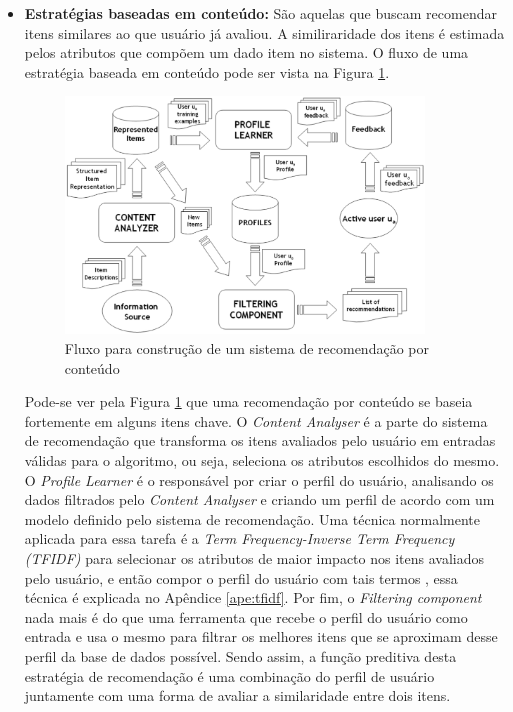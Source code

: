 \begin{itemize}
    \item \textbf{Estratégias baseadas em conteúdo: } São aquelas que buscam
        recomendar itens similares ao que usuário já avaliou. A similiraridade
        dos itens é estimada pelos atributos que compõem um dado item no
        sistema. O fluxo de uma estratégia baseada em conteúdo pode ser vista na
        Figura \ref{fig:recomendacao_conteudo}.

        \begin{figure}[h]
            \centering
            \includegraphics[width=0.9\textwidth]{figuras/recomendacao_conteudo}
            \caption{Fluxo para construção de um sistema de recomendação por
            conteúdo \cite{lops2011content}}
            \label{fig:recomendacao_conteudo}
        \end{figure}

        Pode-se ver pela Figura \ref{fig:recomendacao_conteudo} que uma recomendação
        por conteúdo se baseia fortemente em alguns itens chave. O
        \textit{Content Analyser} é a parte do sistema de recomendação que
        transforma os itens avaliados pelo usuário em entradas válidas para o
        algoritmo, ou seja, seleciona os atributos escolhidos do mesmo. O
        \textit{Profile Learner} é o responsável por criar o perfil do
        usuário, analisando os dados filtrados pelo \textit{Content Analyser} e
        criando um perfil de acordo com um modelo definido pelo sistema de
        recomendação. Uma técnica normalmente aplicada para essa tarefa é a
        \textit{Term Frequency-Inverse Term Frequency (TFIDF)} para selecionar
        os atributos de maior impacto nos itens avaliados pelo usuário, e então
        compor o perfil do usuário com tais termos \cite{lops2011content},
        essa técnica é explicada no Apêndice \ref{ape:tfidf}.  Por fim, o
        \textit{Filtering component} nada mais é do que uma ferramenta que recebe
        o perfil do usuário como entrada e usa o mesmo para filtrar os melhores
        itens que se aproximam desse perfil da base de dados possível. Sendo assim,
        a função preditiva desta estratégia de recomendação é uma combinação do
        perfil de usuário juntamente com uma forma de avaliar a similaridade entre
        dois itens.


\end{itemize}
